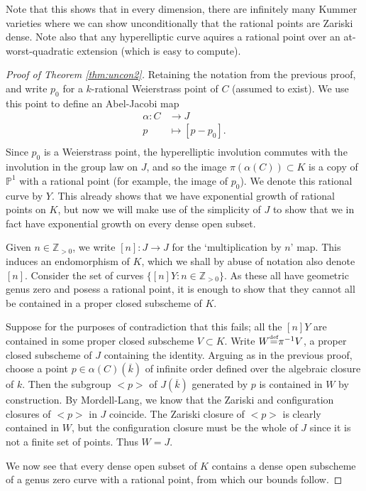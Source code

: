 \documentclass[a4paper,12pt]{amsart}
\begin{document}
Note that this shows that in every dimension, there are infinitely many Kummer varieties where we can show unconditionally that the rational points are Zariski dense. Note also that any hyperelliptic curve aquires a rational point over an at-worst-quadratic extension (which is easy to compute). 

\begin{proof}[Proof of Theorem \ref{thm:uncon2}]
Retaining the notation from the previous proof, and write $p_0$ for a $k$-rational Weierstrass point of $C$ (assumed to exist). We use this point to define an Abel-Jacobi map
\begin{equation}
\begin{split}
\alpha: C & \rightarrow J\\
p & \mapsto [p - p_0]. \\
\end{split}
\end{equation}
Since $p_0$ is a Weierstrass point, the hyperelliptic involution commutes with the involution in the group law on $J$, and so the image $\pi(\alpha(C)) \subset K$ is a copy of ${{\mathbb P}}^1$ with a rational point (for example, the image of $p_0$). We denote this rational curve by $Y$. This already shows that we have exponential growth of rational points on $K$, but now we will make use of the simplicity of $J$ to show that we in fact have exponential growth on every dense open subset. 

Given $n \in {{\mathbb Z}}_{>0}$, we write $[n]:J \rightarrow J$ for the `multiplication by $n$' map. This induces an endomorphism of $K$, which we shall by abuse of notation also denote $[n]$. Consider the set of curves $\{[n]Y :n \in {{\mathbb Z}}_{>0}\}$. As these all have geometric genus zero and posess a rational point, it is enough to show that they cannot all be contained in a proper closed subscheme of $K$. 

Suppose for the purposes of contradiction that this fails; all the $[n]Y$ are contained in some proper closed subscheme $V \subset K$. Write $W {\stackrel{\text{\tiny def}}{=}} \pi^{-1}V$, a proper closed subscheme of $J$ containing the identity. Arguing as in the previous proof, choose a point $p \in \alpha(C)(\overline{k})$ of infinite order defined over the algebraic closure of $k$. Then the subgroup $<p>$ of $J(\overline{k})$ generated by $p$ is contained in $W$ by construction. By Mordell-Lang, we know that the Zariski and configuration closures of $<p>$ in $J$ coincide. The Zariski closure of $<p>$ is clearly contained in $W$, but the configuration closure must be the whole of $J$ since it is not a finite set of points. Thus $W = J$. 

We now see that every dense open subset of $K$ contains a dense open subscheme of a genus zero curve with a rational point, from which our bounds follow. 
\end{proof}
\end{document}
